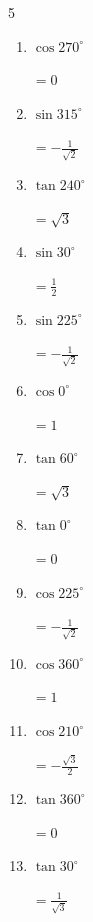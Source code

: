 \begin{multicols}{5}
\begin{enumerate}
        $\displaystyle =1$

  \item $\displaystyle \cos{270^\circ}$

        $\displaystyle =0$

  \item $\displaystyle \sin{315^\circ}$

        $\displaystyle =-\frac{1}{\sqrt{2}}$

  \item $\displaystyle \tan{240^\circ}$

        $\displaystyle =\sqrt{3}$

  \item $\displaystyle \sin{30^\circ}$

        $\displaystyle =\frac{1}{2}$

  \item $\displaystyle \sin{225^\circ}$

        $\displaystyle =-\frac{1}{\sqrt{2}}$

  \item $\displaystyle \cos{0^\circ}$

        $\displaystyle =1$

  \item $\displaystyle \tan{60^\circ}$

        $\displaystyle =\sqrt{3}$

  \item $\displaystyle \tan{0^\circ}$

        $\displaystyle =0$

  \item $\displaystyle \cos{225^\circ}$

        $\displaystyle =-\frac{1}{\sqrt{2}}$

  \item $\displaystyle \cos{360^\circ}$

        $\displaystyle =1$

  \item $\displaystyle \cos{210^\circ}$

        $\displaystyle =-\frac{\sqrt{3}}{2}$

  \item $\displaystyle \tan{360^\circ}$

        $\displaystyle =0$

  \item $\displaystyle \tan{30^\circ}$

        $\displaystyle =\frac{1}{\sqrt{3}}$


\end{enumerate}
\end{multicols}
